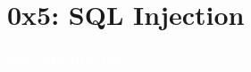 \documentclass[aspectratio=169]{beamer}
\begin{document}
\section{0x5: SQL Injection}
{
\begin{frame}
\huge{\textcolor{white}{\textbf{0x6: SQL Injection}}}
\end{frame}
}
\end{document}
